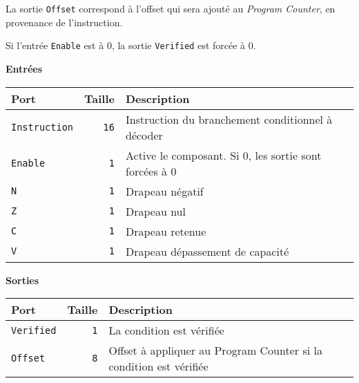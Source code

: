 \documentclass{article}
\begin{document}
    La sortie \texttt{Offset} correspond à l'offset qui sera ajouté au \textit{Program Counter}, en provenance de l'instruction.

    Si l'entrée \texttt{Enable} est à 0, la sortie \texttt{Verified} est forcée à 0.


    \textbf{Entrées}\\

    \begin{tabular}{|l|r|l|}
        \hline
        \textbf{Port}       & \textbf{Taille} & \textbf{Description}                                   \\
        \hline

        \texttt{Instruction} & \texttt{16}     & Instruction du branchement conditionnel à décoder      \\
        \hline
        \texttt{Enable}     & \texttt{1}      & Active le composant.
        Si 0, les sortie sont forcées à 0 \\
        \hline
        \texttt{N}          & \texttt{1}      & Drapeau négatif                                        \\
        \hline
        \texttt{Z}          & \texttt{1}      & Drapeau nul                                            \\
        \hline
        \texttt{C}          & \texttt{1}      & Drapeau retenue                                        \\
        \hline
        \texttt{V}          & \texttt{1}      & Drapeau dépassement de capacité                        \\


        \hline
    \end{tabular}

    \vspace{1em}
    \textbf{Sorties}\\

    \begin{tabular}{|l|r|l|}
        \hline
        \textbf{Port}      & \textbf{Taille} & \textbf{Description}                                               \\

        \hline
        \texttt{Verified} & \texttt{1}      & La condition est vérifiée                                          \\
        \hline
        \texttt{Offset}  & \texttt{8}      & Offset à appliquer au Program Counter si la condition est vérifiée \\

        \hline
    \end{tabular}
\end{document}
